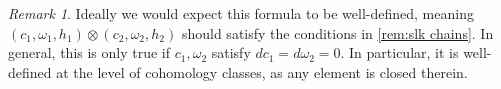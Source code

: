 \documentclass[10pt]{amsart}
\theoremstyle{definition}
\theoremstyle{remark}
\newtheorem{remark}[equation]{Remark}
\numberwithin{equation}{section}
\begin{document}
\begin{remark}
  Ideally we would expect this formula to be well-defined, meaning $(c_1, \omega_1, h_1) \otimes (c_2, \omega_2, h_2)$ should satisfy the conditions in \cref{rem:slk chains}. In general, this is only true if $c_1,\omega_2$ satisfy $dc_1 = d\omega_2 = 0$. In particular, it is well-defined at the level of cohomology classes, as any element is closed therein.
\end{remark}




{\footnotesize


}
\end{document}

